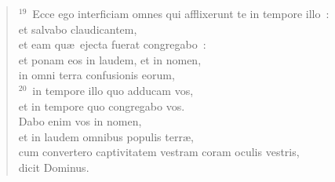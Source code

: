 \begin{verse}
${}^{19}$~Ecce ego interficiam omnes qui afflixerunt te in tempore illo~:\\ et salvabo claudicantem,\\ et eam qu\ae\ ejecta fuerat congregabo~:\\ et ponam eos in laudem, et in nomen,\\ in omni terra confusionis eorum,\\
${}^{20}$~in tempore illo quo adducam vos,\\ et in tempore quo congregabo vos.\\ Dabo enim vos in nomen,\\ et in laudem omnibus populis terr\ae ,\\ cum convertero captivitatem vestram coram oculis vestris,\\ dicit Dominus.\end{verse}



